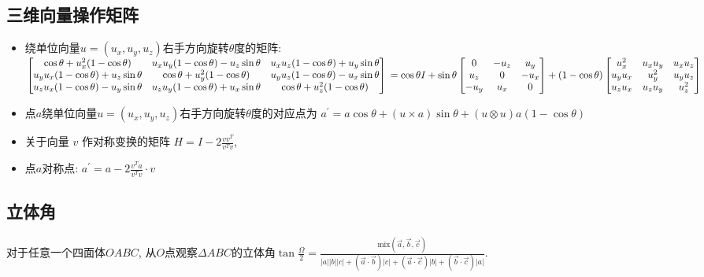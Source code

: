 \documentclass[landscape, twocolumn, 8pt, a4paper, twoside]{extarticle}
\begin{document}
\begin{spacing}{0.1}
  \subsection{三维向量操作矩阵}
  \begin{itemize}
  \item 绕单位向量$u = (u_x, u_y, u_z)$右手方向旋转$\theta$度的矩阵: \\
    $
    \begin{bmatrix}
      \cos\theta + u_x^2 (1 - \cos\theta)    &    u_x u_y (1 - \cos\theta) - u_z \sin\theta    &    u_x u_z (1 - \cos\theta) + u_y \sin\theta \\
    u_y u_x (1 - \cos\theta) + u_z \sin\theta    &    \cos\theta + u_y^2 (1 - \cos\theta)    &    u_y u_z (1 - \cos\theta) - u_x \sin\theta \\
    u_z u_x (1 - \cos\theta) - u_y \sin\theta    &    u_z u_y (1 - \cos\theta) + u_x \sin\theta    &    \cos\theta + u_z^2 (1 - \cos\theta)
  \end{bmatrix} \\
  = \cos\theta I
  + \sin\theta
  \begin{bmatrix}
    0    &    -u_z    &    u_y \\
    u_z    &    0    &    -u_x \\
    -u_y    &    u_x    &    0
  \end{bmatrix}
  + (1 - \cos\theta)
  \begin{bmatrix}
    u_x ^ 2    &    u_x u_y    &    u_x u_z \\
    u_y u_x    &    u_y ^ 2    &    u_y u_z \\
    u_z u_x    &    u_z u_y    &    u_z ^ 2
  \end{bmatrix}
  $
  \item 点$a$绕单位向量$u = (u_x, u_y, u_z)$右手方向旋转$\theta$度的对应点为
  $a^\prime = a \cos\theta + (u \times a) \sin\theta + (u \otimes u) a (1 - \cos\theta)$
  \item 关于向量 $v$ 作对称变换的矩阵 $H = I - 2 \frac{v v^T}{v^T v}$,
  \item 点$a$对称点: $a^\prime = a - 2 \frac{v^T a}{v^T v} \cdot v$
  \end{itemize}
  \subsection{立体角}
  对于任意一个四面体$OABC$,
  从$O$点观察$\Delta ABC$的立体角$\tan{\frac{\Omega}{2}} = 
  \frac{\textrm{mix}(\overrightarrow{a}, \overrightarrow{b}, \overrightarrow{c}) }{
  |a||b||c|
  + (\overrightarrow{a} \cdot \overrightarrow{b}) |c|
  + (\overrightarrow{a} \cdot \overrightarrow{c}) |b|
  + (\overrightarrow{b} \cdot \overrightarrow{c}) |a|
}$.


\end{spacing}
\end{document}
